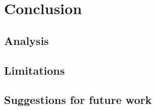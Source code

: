 \chapter{Conclusion}
\label{sec:conclusion}

\section{Analysis}
\label{sec:conclusion:analysis}

\section{Limitations}
\label{sec:conclusion:limitations}

\section{Suggestions for future work}
\label{sec:conclusion:future}

